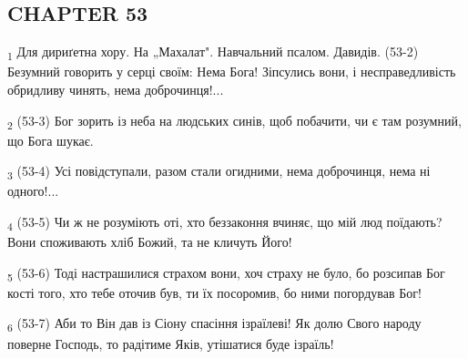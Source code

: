 \subsection{CHAPTER 53}
\begin{tcolorbox}
\textsubscript{1} Для дириґетна хору. На „Махалат". Навчальний псалом. Давидів. (53-2) Безумний говорить у серці своїм: Нема Бога! Зіпсулись вони, і несправедливість обридливу чинять, нема доброчинця!...
\end{tcolorbox}
\begin{tcolorbox}
\textsubscript{2} (53-3) Бог зорить із неба на людських синів, щоб побачити, чи є там розумний, що Бога шукає.
\end{tcolorbox}
\begin{tcolorbox}
\textsubscript{3} (53-4) Усі повідступали, разом стали огидними, нема доброчинця, нема ні одного!...
\end{tcolorbox}
\begin{tcolorbox}
\textsubscript{4} (53-5) Чи ж не розуміють оті, хто беззаконня вчиняє, що мій люд поїдають? Вони споживають хліб Божий, та не кличуть Його!
\end{tcolorbox}
\begin{tcolorbox}
\textsubscript{5} (53-6) Тоді настрашилися страхом вони, хоч страху не було, бо розсипав Бог кості того, хто тебе оточив був, ти їх посоромив, бо ними погордував Бог!
\end{tcolorbox}
\begin{tcolorbox}
\textsubscript{6} (53-7) Аби то Він дав із Сіону спасіння ізраїлеві! Як долю Свого народу поверне Господь, то радітиме Яків, утішатися буде ізраїль!
\end{tcolorbox}
